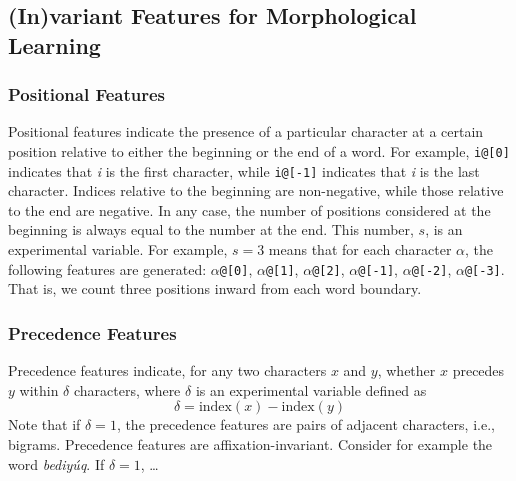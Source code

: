 \subsection{(In)variant Features for Morphological Learning}

\subsubsection{Positional Features}
Positional features
indicate the presence of a particular
character at a certain position relative to either the beginning or the end of 
a word. For example, \texttt{i@[0]} indicates that \textit{i} is the first 
character, while \texttt{i@[-1]} indicates that \textit{i} is the last character. 
Indices relative to the beginning are non-negative, while those relative 
to the end are negative. In any case, the number of positions considered 
at the beginning is always equal to the number at the end. This number, 
$s$, is an experimental variable.
For example, $s=3$ means that for each character $\alpha$, the following 
features are generated: $\alpha$\texttt{@[0]}, $\alpha$\texttt{@[1]}, 
$\alpha$\texttt{@[2]}, $\alpha$\texttt{@[-1]}, $\alpha$\texttt{@[-2]}, 
$\alpha$\texttt{@[-3]}.
That is, we count three positions inward from each word boundary.

\subsubsection{Precedence Features}
Precedence features indicate, for any two characters $x$ and $y$,
whether $x$ precedes $y$ within $\delta$ characters,
where $\delta$ is an experimental variable defined as
	\begin{equation*}
	\delta = \text{index}(x) - \text{index}(y)
	\end{equation*}
Note that if $\delta = 1$, the precedence features are pairs of adjacent 
characters, i.e., bigrams.
Precedence features are affixation-invariant. Consider for example 
the word \textit{bediy\'uq}. If $\delta = 1$, \dots 

